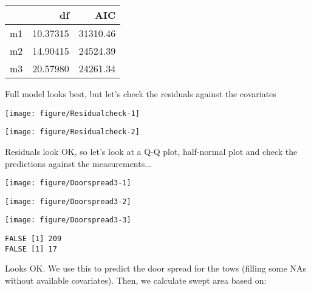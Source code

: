 \documentclass[12pt]{article}\usepackage[]{graphicx}\usepackage[]{color}
\makeatletter
\def\maxwidth{ %
  \ifdim\Gin@nat@width>\linewidth
    \linewidth
  \else
    \Gin@nat@width
  \fi
}
\newenvironment{kframe}{%
 \def\at@end@of@kframe{}%
 \ifinner\ifhmode%
  \def\at@end@of@kframe{\end{minipage}}%
  \begin{minipage}{\columnwidth}%
 \fi\fi%
 \def\FrameCommand##1{\hskip\@totalleftmargin \hskip-\fboxsep
 \colorbox{shadecolor}{##1}\hskip-\fboxsep
     \hskip-\linewidth \hskip-\@totalleftmargin \hskip\columnwidth}%
 \MakeFramed {\advance\hsize-\width
   \@totalleftmargin\z@ \linewidth\hsize
   \@setminipage}}%
 {\par\unskip\endMakeFramed%
 \at@end@of@kframe}
\newenvironment{knitrout}{}{} %
\makeatother
\begin{document}
\begin{tabular}{l|r|r}
\hline
  & df & AIC\\
\hline
m1 & 10.37315 & 31310.46\\
\hline
m2 & 14.90415 & 24524.39\\
\hline
m3 & 20.57980 & 24261.34\\
\hline
\end{tabular}



Full model looks best, but let's check the residuals against the covariates
\begin{knitrout}\footnotesize
{}\color{fgcolor}

{\centering \texttt{[image: figure/Residualcheck-1]} 

}




{\centering \texttt{[image: figure/Residualcheck-2]} 

}



\end{knitrout}

Residuals look OK, so let's look at a Q-Q plot, half-normal plot and check the
predictions against the measurements...

\begin{knitrout}\footnotesize
{}\color{fgcolor}

{\centering \texttt{[image: figure/Doorspread3-1]} 

}




{\centering \texttt{[image: figure/Doorspread3-2]} 

}




{\centering \texttt{[image: figure/Doorspread3-3]} 

}


\begin{kframe}\begin{verbatim}
FALSE [1] 209
FALSE [1] 17
\end{verbatim}
\end{kframe}
\end{knitrout}

Looks OK.  We use this to predict the door spread for the tows (filling some
NAs without available covariates). Then, we calculate swept area based on:
\end{document}
